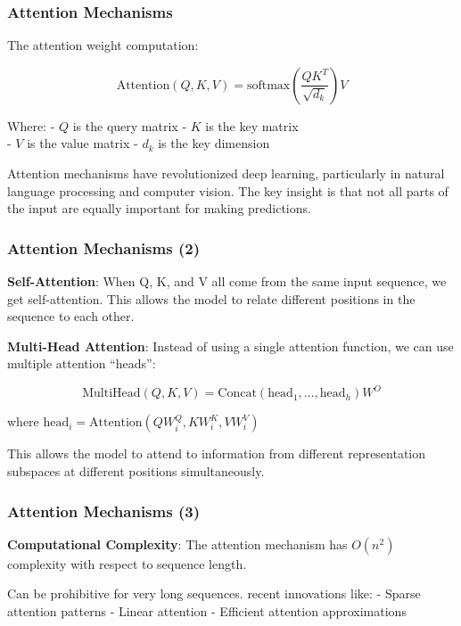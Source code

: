\documentclass[
]{article}
\begin{document}
\subsubsection{Attention Mechanisms}\label{attention-mechanisms}

The attention weight computation:

\[\text{Attention}(Q, K, V) = \text{softmax}\left(\frac{QK^T}{\sqrt{d_k}}\right)V\]

Where: - \(Q\) is the query matrix - \(K\) is the key matrix\\
- \(V\) is the value matrix - \(d_k\) is the key dimension

Attention mechanisms have revolutionized deep learning, particularly in
natural language processing and computer vision. The key insight is that
not all parts of the input are equally important for making predictions.

\subsubsection{Attention Mechanisms (2)}\label{attention-mechanisms-2}

\textbf{Self-Attention}: When Q, K, and V all come from the same input
sequence, we get self-attention. This allows the model to relate
different positions in the sequence to each other.

\textbf{Multi-Head Attention}: Instead of using a single attention
function, we can use multiple attention ``heads'':

\[\text{MultiHead}(Q, K, V) = \text{Concat}(\text{head}_1, ..., \text{head}_h)W^O\]

where \(\text{head}_i = \text{Attention}(QW_i^Q, KW_i^K, VW_i^V)\)

This allows the model to attend to information from different
representation subspaces at different positions simultaneously.

\subsubsection{Attention Mechanisms (3)}\label{attention-mechanisms-3}

\textbf{Computational Complexity}: The attention mechanism has
\(O(n^2)\) complexity with respect to sequence length.

Can be prohibitive for very long sequences. recent innovations like: -
Sparse attention patterns - Linear attention - Efficient attention
approximations
\end{document}
